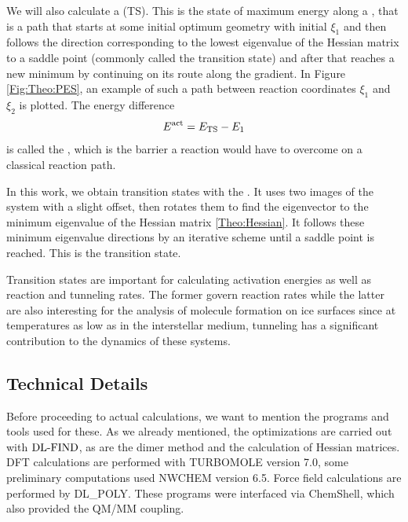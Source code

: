 We will also calculate a  (TS). This
is the state of maximum energy along a , that is a path that
starts at some initial optimum geometry with initial 
$\xi_1$ and then follows the direction corresponding to the lowest eigenvalue of
the Hessian matrix to a saddle point (commonly called the transition state) and
after that reaches a new minimum by continuing on its route along the gradient. In Figure
\ref{Fig:Theo:PES}, an example of such a path between reaction coordinates
$\xi_1$ and $\xi_{2}$ is plotted. The energy difference 
\begin{equation}
E^{\text{act}}=E_{\text{TS}} - E_1
\end{equation}
is called the , which is the barrier a reaction would
have to overcome on a classical reaction path.

In this work, we obtain transition states with the 
.\cite{HenkelmanJonsson1999} It uses two images of the system with a slight
offset, then rotates them to find the eigenvector to the minimum eigenvalue of the Hessian
matrix \eqref{Theo:Hessian}. It follows these minimum eigenvalue directions by an
iterative scheme until a saddle point is reached. This is the transition state.

Transition states are important for calculating activation energies as well as
reaction and tunneling rates. The former govern reaction rates while the latter
are also interesting for the analysis of molecule formation on ice surfaces since at
temperatures as low as in the interstellar medium, tunneling has a significant
contribution to the dynamics of these systems.

\subsection{Technical Details}

Before proceeding to actual calculations, we want to mention the programs and tools 
used for these. As we already mentioned, the optimizations are carried out with
$\text{DL-FIND}$, \cite{Kaestner2009} as are the dimer method and the calculation of 
Hessian matrices. DFT calculations are performed with
TURBOMOLE version 7.0,\cite{TURBOMOLE} some preliminary computations used
NWCHEM version 6.5.\cite{ValievBylaskaGovindEtAl2010} Force field calculations
are performed by DL\_POLY.\cite{TodorovSmithTrachenkoEtAl2006} These programs
were interfaced via \mbox{ChemShell},\cite{chemshell,MetzKaestnerSokolEtAl2013}
which also provided the QM/MM coupling.

